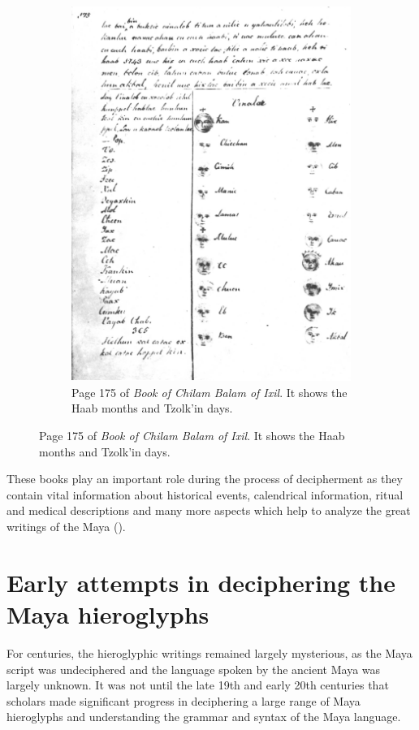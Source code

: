 \documentclass[../main.tex]{subfiles}
\begin{document}
\begin{figure}
\begin{subfigure}[b]{0.49\textwidth}
        \includegraphics[width=\textwidth]{img/chilam-balam-of-ixil-page-175}
        \caption{Page 175 of \emph{Book of Chilam Balam of Ixil}.
                 It shows the Haab months and Tzolk'in days.}
        \label{fig:introduction-chilam-balam-of-ixil-page-175}
    \end{subfigure}
\end{figure}

These books play an important role during the process of decipherment as they contain vital 
information about historical events, calendrical information, ritual and medical descriptions 
and many more aspects which help to analyze the great writings of the Maya (\cite[3\psq]{roys1933}).

\section{Early attempts in deciphering the Maya hieroglyphs}
For centuries, the hieroglyphic writings remained largely mysterious, as the Maya script was 
undeciphered and the language spoken by the ancient Maya was largely unknown.
It was not until the late 19th and early 20th centuries that scholars made significant progress 
in deciphering a large range of Maya hieroglyphs and understanding the grammar and syntax of 
the Maya language. 
\end{document}

